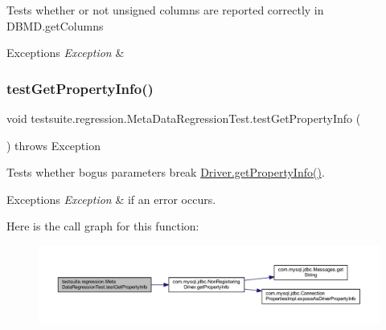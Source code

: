 Tests whether or not unsigned columns are reported correctly in D\+B\+M\+D.\+get\+Columns


\begin{DoxyExceptions}{Exceptions}
{\em Exception} & \\
\hline
\end{DoxyExceptions}
\mbox{\label{classtestsuite_1_1regression_1_1_meta_data_regression_test_a19b374def5386df4eb8d89ef0c85375f}} 
\subsubsection{\texorpdfstring{test\+Get\+Property\+Info()}{testGetPropertyInfo()}}
{\footnotesize\ttfamily void testsuite.\+regression.\+Meta\+Data\+Regression\+Test.\+test\+Get\+Property\+Info (\begin{DoxyParamCaption}{ }\end{DoxyParamCaption}) throws Exception}

Tests whether bogus parameters break \mbox{\hyperlink{classcom_1_1mysql_1_1jdbc_1_1_non_registering_driver_a726bb5014e1cdfffa313257781d4496d}{Driver.\+get\+Property\+Info()}}.


\begin{DoxyExceptions}{Exceptions}
{\em Exception} & if an error occurs. \\
\hline
\end{DoxyExceptions}
Here is the call graph for this function\+:
\nopagebreak
\begin{figure}[H]
\begin{center}
\leavevmode
\includegraphics[width=350pt]{classtestsuite_1_1regression_1_1_meta_data_regression_test_a19b374def5386df4eb8d89ef0c85375f_cgraph}
\end{center}
\end{figure}
\mbox{\label{classtestsuite_1_1regression_1_1_meta_data_regression_test_adb0e8b0fcde945a0ebdfbd318975979b}} 
